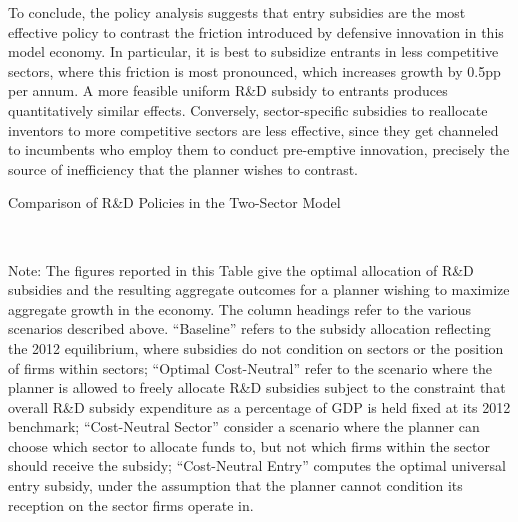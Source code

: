 To conclude, the policy analysis suggests that entry subsidies are
the most effective policy to contrast the friction introduced by defensive
innovation in this model economy. In particular, it is best to subsidize
entrants in less competitive sectors, where this friction is most
pronounced, which increases growth by 0.5pp per annum. A more feasible
uniform R\&D subsidy to entrants produces quantitatively similar effects.
Conversely, sector-specific subsidies to reallocate inventors to more
competitive sectors are less effective, since they get channeled to
incumbents who employ them to conduct pre-emptive innovation, precisely
the source of inefficiency that the planner wishes to contrast.

\begin{table}

\caption{Comparison of R\&D Policies in the Two-Sector Model}
\label{tab: Policy}
\begin{centering}
\\
\par\end{centering}
\raggedright{}{\small{}Note: The figures reported in this Table give
the optimal allocation of R\&D subsidies and the resulting aggregate
outcomes for a planner wishing to maximize aggregate growth in the
economy. The column headings refer to the various scenarios described
above. ``Baseline'' refers to the subsidy allocation reflecting
the 2012 equilibrium, where subsidies do not condition on sectors
or the position of firms within sectors; ``Optimal Cost-Neutral''
refer to the scenario where the planner is allowed to freely allocate
R\&D subsidies subject to the constraint that overall R\&D subsidy
expenditure as a percentage of GDP is held fixed at its 2012 benchmark;
``Cost-Neutral Sector'' consider a scenario where the planner can
choose which sector to allocate funds to, but not which firms within
the sector should receive the subsidy; ``Cost-Neutral Entry'' computes
the optimal universal entry subsidy, under the assumption that the
planner cannot condition its reception on the sector firms operate
in. }{\small\par}
\end{table}

